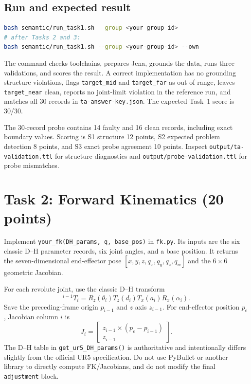 \documentclass[11pt]{article}
\newcommand{\code}[1]{\nolinkurl{#1}}
\begin{document}
\subsection{Run and expected result}

\begin{lstlisting}[language=bash]
bash semantic/run_task1.sh --group <your-group-id>
# after Tasks 2 and 3:
bash semantic/run_task1.sh --group <your-group-id> --own
\end{lstlisting}

The command checks toolchains, prepares Jena, grounds the data, runs three
validations, and scores the result. A correct implementation has no grounding
structure violations, flags \code{target_mid} and \code{target_far} as out of
range, leaves \code{target_near} clean, reports no joint-limit violation in the
reference run, and matches all 30 records in \code{ta-answer-key.json}. The
expected Task~1 score is 30/30.

\begin{tutornote}
The 30-record probe contains 14 faulty and 16 clean records, including exact
boundary values. Scoring is S1 structure 12 points, S2 expected problem
detection 8 points, and S3 exact probe agreement 10 points. Inspect
\code{output/ta-validation.ttl} for structure diagnostics and
\code{output/probe-validation.ttl} for probe mismatches.
\end{tutornote}

\section{Task 2: Forward Kinematics (20 points)}

Implement \code{your_fk(DH_params, q, base_pos)} in \code{fk.py}. Its inputs
are the six classic D--H parameter records, six joint angles, and a base
position. It returns the seven-dimensional end-effector pose
\([x,y,z,q_x,q_y,q_z,q_w]\) and the $6\times6$ geometric Jacobian.

For each revolute joint, use the classic D--H transform
\[
{}^{i-1}T_i=R_z(\theta_i)T_z(d_i)T_x(a_i)R_x(\alpha_i).
\]
Save the preceding-frame origin $p_{i-1}$ and $z$ axis $z_{i-1}$. For
end-effector position $p_e$, Jacobian column $i$ is
\[
J_i=\begin{bmatrix}z_{i-1}\times(p_e-p_{i-1})\\z_{i-1}\end{bmatrix}.
\]
The D--H table in \code{get_ur5_DH_params()} is authoritative and intentionally
differs slightly from the official UR5 specification. Do not use PyBullet or
another library to directly compute FK/Jacobians, and do not modify the final
\code{adjustment} block.
\end{document}

